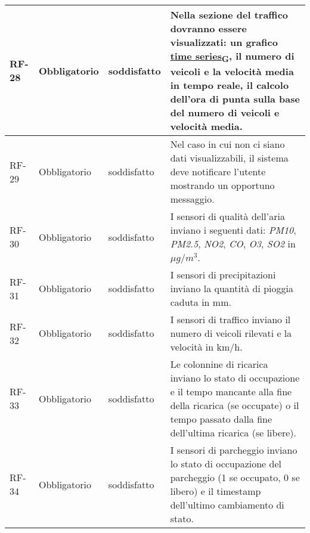 \begin{longtable}{|>{\centering\arraybackslash}m{}|>{\centering\arraybackslash}m{}|>{\centering\arraybackslash}m{}|>{\centering\arraybackslash}m{}|}
	\\\hline
	RF-28           & Obbligatorio        & soddisfatto                                                                                                           & Nella sezione del traffico dovranno essere visualizzati: un grafico \href{https://7last.github.io/docs/pb/documentazione-interna/glossario\#time-series}{time series\textsubscript{G}}, il numero di veicoli e la velocità media in tempo reale, il calcolo dell'ora di punta sulla base del numero di veicoli e velocità media.
	\\\hline
	RF-29           & Obbligatorio        & soddisfatto                                                                                                           & Nel caso in cui non ci siano dati visualizzabili, il sistema deve notificare l'utente mostrando un opportuno messaggio.
	\\\hline
	RF-30           & Obbligatorio        & soddisfatto                                                                                                           & I sensori di qualità dell'aria inviano i seguenti dati: \textit{PM10}, \textit{PM2.5}, \textit{NO2}, \textit{CO}, \textit{O3}, \textit{SO2} in $\mu g/m^3$.
	\\\hline
	RF-31           & Obbligatorio        & soddisfatto                                                                                                           & I sensori di precipitazioni inviano la quantità di pioggia caduta in mm.
	\\\hline
	RF-32           & Obbligatorio        & soddisfatto                                                                                                           & I sensori di traffico inviano il numero di veicoli rilevati e la velocità in km/h.
	\\\hline
	RF-33           & Obbligatorio        & soddisfatto                                                                                                           & Le colonnine di ricarica inviano lo stato di occupazione e il tempo mancante alla fine della ricarica (se occupate) o il tempo passato dalla fine dell'ultima ricarica (se libere).
	\\\hline
	RF-34           & Obbligatorio        & soddisfatto                                                                                                           & I sensori di parcheggio inviano lo stato di occupazione del parcheggio (1 se occupato, 0 se libero) e il timestamp dell'ultimo cambiamento di stato.
	\\\hline

\end{longtable}
